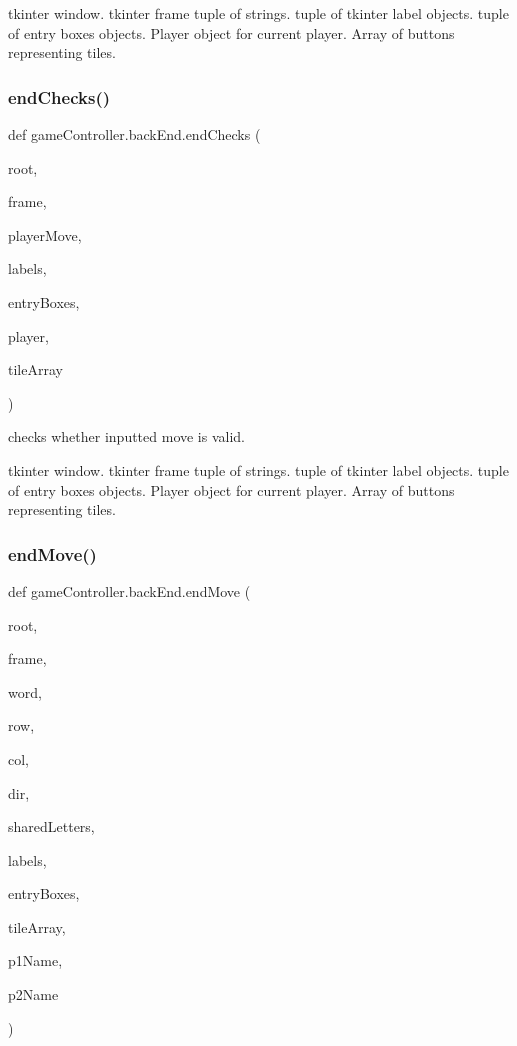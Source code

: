 tkinter window.  tkinter frame  tuple of strings.  tuple of tkinter label objects.  tuple of entry boxes objects.  Player object for current player.  Array of buttons representing tiles. \mbox{\label{classgame_controller_1_1back_end_a650a75e35e8020a699462d7ae57c4874}} 
\subsubsection{\texorpdfstring{end\+Checks()}{endChecks()}}
{\footnotesize\ttfamily def game\+Controller.\+back\+End.\+end\+Checks (\begin{DoxyParamCaption}\item[{}]{root,  }\item[{}]{frame,  }\item[{}]{player\+Move,  }\item[{}]{labels,  }\item[{}]{entry\+Boxes,  }\item[{}]{player,  }\item[{}]{tile\+Array }\end{DoxyParamCaption})}



checks whether inputted move is valid. 

tkinter window.  tkinter frame  tuple of strings.  tuple of tkinter label objects.  tuple of entry boxes objects.  Player object for current player.  Array of buttons representing tiles. \mbox{\label{classgame_controller_1_1back_end_ad722a8ae3b194fb3621d43a8718d02e8}} 
\subsubsection{\texorpdfstring{end\+Move()}{endMove()}}
{\footnotesize\ttfamily def game\+Controller.\+back\+End.\+end\+Move (\begin{DoxyParamCaption}\item[{}]{root,  }\item[{}]{frame,  }\item[{}]{word,  }\item[{}]{row,  }\item[{}]{col,  }\item[{}]{dir,  }\item[{}]{shared\+Letters,  }\item[{}]{labels,  }\item[{}]{entry\+Boxes,  }\item[{}]{tile\+Array,  }\item[{}]{p1\+Name,  }\item[{}]{p2\+Name }\end{DoxyParamCaption})}



